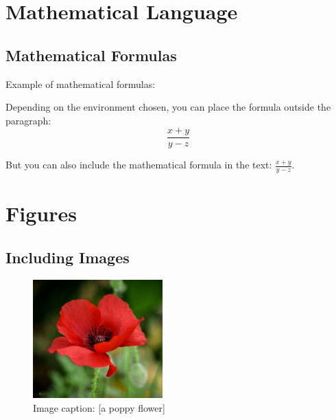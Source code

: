 \section{Mathematical Language}

\subsection{Mathematical Formulas}

Example of mathematical formulas:

Depending on the environment chosen, you can place the formula outside the paragraph:
\begin{displaymath} %
\frac{x+y}{y-z}
\end{displaymath}

But you can also include the mathematical formula in the text: \begin{math}\frac{x+y}{y-z}\end{math}.%


\section{Figures}

\subsection{Including Images}

\begin{figure}[!h] %
\begin{center}
\includegraphics[width=5cm]{images/poppyimage} %
\caption{Image caption: [a poppy flower]}
\label{poppy}
\end{center}
\end{figure}

